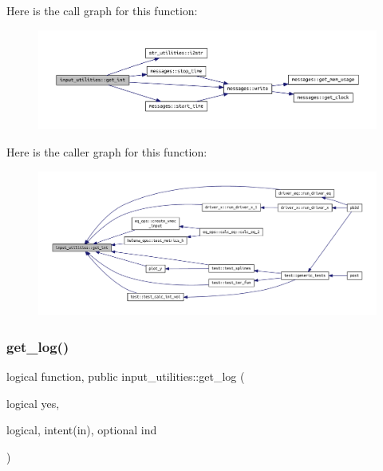 Here is the call graph for this function\+:\nopagebreak
\begin{figure}[H]
\begin{center}
\leavevmode
\includegraphics[width=350pt]{namespaceinput__utilities_a03e09af96ba6f7e187ea4a1d9b743148_cgraph}
\end{center}
\end{figure}
Here is the caller graph for this function\+:\nopagebreak
\begin{figure}[H]
\begin{center}
\leavevmode
\includegraphics[width=350pt]{namespaceinput__utilities_a03e09af96ba6f7e187ea4a1d9b743148_icgraph}
\end{center}
\end{figure}
\mbox{\label{namespaceinput__utilities_ad9ce824c30b32041ab70f3fb191f06db}} 
\subsubsection{\texorpdfstring{get\+\_\+log()}{get\_log()}}
{\footnotesize\ttfamily logical function, public input\+\_\+utilities\+::get\+\_\+log (\begin{DoxyParamCaption}\item[{logical}]{yes,  }\item[{logical, intent(in), optional}]{ind }\end{DoxyParamCaption})}



